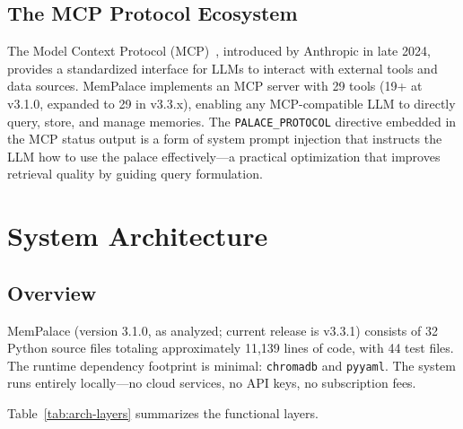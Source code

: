 \documentclass[twoside,11pt]{article}
\begin{document}
\subsection{The MCP Protocol Ecosystem}

The Model Context Protocol (MCP)~\citep{mcp}, introduced by Anthropic in late
2024, provides a standardized interface for LLMs to interact with external
tools and data sources.  MemPalace implements an MCP server with 29 tools
(19+ at v3.1.0, expanded to 29 in v3.3.x),
enabling any MCP-compatible LLM to directly query, store, and manage memories.
The \texttt{PALACE\_PROTOCOL} directive embedded in the MCP status output is a
form of system prompt injection that instructs the LLM how to use the palace
effectively---a practical optimization that improves retrieval quality by
guiding query formulation.

\section{System Architecture}
\label{sec:arch}

\subsection{Overview}

MemPalace (version 3.1.0, as analyzed; current release is v3.3.1) consists of 32 Python source files
totaling approximately 11{,}139 lines of code, with 44 test files.  The
runtime dependency footprint is minimal: \texttt{chromadb} and
\texttt{pyyaml}.  The system runs entirely locally---no cloud services, no API
keys, no subscription fees.

Table~\ref{tab:arch-layers} summarizes the functional layers.
\end{document}
